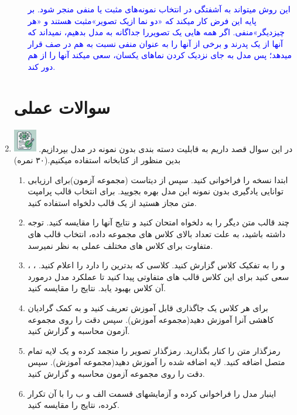 \documentclass[12pt]{article}
\begin{document}
\begin{enumerate}
\begin{enumerate}
            \textcolor{blue}{
            این روش میتواند به آشفتگی در انتخاب نمونه‌های مثبت یا منفی منجر شود.  بر پایه این فرض کار میکند که «دو نما ازیک تصویر»مثبت هستند و «هر چیزدیگر»منفی. اگر همه  هایی یک تصویررا جداگانه به مدل بدهیم،  نمیداند که آنها از یک پدرند و برخی از آنها را به عنوان منفی نسبت به هم در صف قرار میدهد؛ پس مدل به جای نزدیک کردن نماهای یکسان، سعی میکند آنها را از هم دور کند.
            }
        \end{enumerate}
      	
    \section*{سوالات عملی} 
    \item \includegraphics[width=1cm]{figs/Allowed_with_contributino.jpg}
    در این سوال قصد داریم به قابلیت دسته بندی بدون نمونه در مدل  بپردازیم. بدین منظور از کتابخانه \href{https://github.com/mlfoundations/open_clip}{} استفاده میکنیم.(۳۰ نمره)
    \begin{enumerate}
        \item ابتدا نسخه  را فراخوانی کنید. سپس از دیتاست \href{https://huggingface.co/datasets/maurice-fp/stanford-dogs}{} (مجموعه آزمون)برای ارزیابی توانایی یادگیری بدون نمونه این مدل بهره بجویید. برای انتخاب قالب پرامپت متن مجاز هستید از یک قالب دلخواه استفاده کنید.
        \item چند قالب متن دیگر را به دلخواه امتحان کنید و نتایج آنها را مقایسه کنید. توجه داشته باشید، به علت تعداد بالای کلاس های مجموعه داده، انتخاب قالب های متفاوت برای کلاس های مختلف عملی به نظر نمیرسد.
        \item {}،  ، و  را به تفکیک کلاس گزارش کنید. کلاسی که بدترین  را دارد را اعلام کنید. سعی کنید برای این کلاس قالب های متفاوتی پیدا کنید تا عملکرد مدل درمورد آن کلاس بهبود یابد. نتایج را مقایسه کنید.
        \item برای هر کلاس یک جاگذاری قابل آموزش تعریف کنید و به کمک گرادیان کاهشی آنرا آموزش دهید(مجموعه آموزش). سپس  دقت را روی مجموعه آزمون محاسبه و گزارش کنید.
        \item رمزگذار متن را کنار بگذارید. رمزگذار تصویر را منجمد کرده و یک لایه تمام متصل اضافه کنید. لایه اضافه شده را آموزش دهید(مجموعه آموزش). سپس  دقت را روی مجموعه آزمون محاسبه و گزارش کنید.
        \item اینبار مدل  را فراخوانی کرده و آزمایشهای قسمت الف و ب را با آن تکرار کرده، نتایج را مقایسه کنید.  
    \end{enumerate}
    

\end{enumerate}
\end{document}
